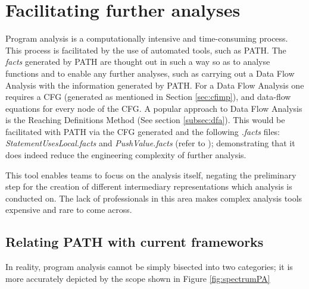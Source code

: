     \section{Facilitating further analyses}
    \label{sec:ffa}
    \par Program analysis is a computationally intensive and time-consuming process. This process is facilitated by the use of automated tools, such as \acs{PATH}. The \textit{facts} generated 
    by \acs{PATH} are thought out in such a way so as to analyse functions and to enable any further analyses, such as carrying out a Data Flow Analysis with the 
    information generated by \acs{PATH}. For a Data Flow Analysis one requires a \acs{CFG} (generated as mentioned in Section \ref{sec:cfimp}), and data-flow equations for every node of the \acs{CFG}.
    A popular approach to Data Flow Analysis is the Reaching Definitions Method (See section \ref{subsec:dfa}). This would be facilitated with \acs{PATH} via the \acs{CFG} generated and the following \textit{.facts} files:
    \textit{StatementUsesLocal.facts} and \textit{PushValue.facts} (refer to ); demonstrating that it does indeed reduce the engineering complexity of further analysis. 
    \par This tool enables teams to focus on the analysis itself, negating the preliminary step for the creation of different intermediary representations which analysis is conducted on. The lack of professionals in this area makes complex analysis tools expensive and rare to come across.
        \subsection{Relating \acs{PATH} with current frameworks}
            \par In reality, program analysis cannot be simply bisected into two categories; it is more accurately depicted by the scope shown in Figure \ref{fig:spectrumPA}


